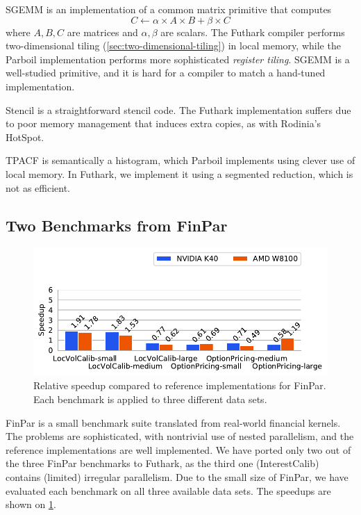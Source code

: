 SGEMM is an implementation of a common matrix primitive that computes
\[
  C \leftarrow \alpha \times A \times B + \beta \times C
\]
where $A,B,C$ are matrices and $\alpha,\beta$ are scalars.  The
Futhark compiler performs two-dimensional tiling
(\cref{sec:two-dimensional-tiling}) in local memory, while the Parboil
implementation performs more sophisticated \textit{register tiling}.
SGEMM is a well-studied primitive, and it is hard for a compiler to
match a hand-tuned implementation.

Stencil is a straightforward stencil code.  The Futhark implementation
suffers due to poor memory management that induces extra copies, as
with Rodinia's HotSpot.

TPACF is semantically a histogram, which Parboil implements using
clever use of local memory.  In Futhark, we implement it using a
segmented reduction, which is not as efficient.

\subsection{Two Benchmarks from FinPar}
\label{sec:finpar}

\begin{figure}
  \centering
  \includegraphics[scale=0.65]{experiments/finpar.pdf}
  \caption{Relative speedup compared to reference implementations for
    FinPar.  Each benchmark is applied to three different data sets.}
  \label{fig:finpar-speedup}
\end{figure}

FinPar is a small benchmark suite translated from real-world financial
kernels.  The problems are sophisticated, with nontrivial use of
nested parallelism, and the reference implementations are well
implemented.  We have ported only two out of the three FinPar
benchmarks to Futhark, as the third one (InterestCalib) contains
(limited) irregular parallelism.  Due to the small size of FinPar, we
have evaluated each benchmark on all three available data sets.  The
speedups are shown on \cref{fig:finpar-speedup}.

